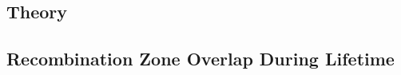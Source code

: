 \documentclass[../thesis.tex]{subfiles}
\begin{document}
\subsection{Theory}

\subsection{Recombination Zone Overlap During Lifetime}
\end{document}
